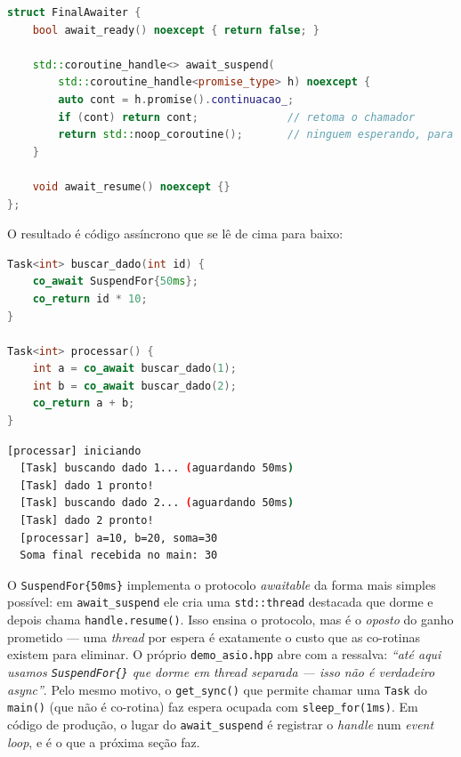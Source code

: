 \begin{lstlisting}[style=bt, language=C++,
    caption={O \texttt{FinalAwaiter} de \texttt{src/coroutines/demo\_task.hpp}:
             ``ao terminar, retome quem me esperava''.}]
struct FinalAwaiter {
    bool await_ready() noexcept { return false; }

    std::coroutine_handle<> await_suspend(
        std::coroutine_handle<promise_type> h) noexcept {
        auto cont = h.promise().continuacao_;
        if (cont) return cont;              // retoma o chamador
        return std::noop_coroutine();       // ninguem esperando, para
    }

    void await_resume() noexcept {}
};
\end{lstlisting}

O resultado é código assíncrono que se lê de cima para baixo:

\begin{lstlisting}[style=bt, language=C++,
    caption={\texttt{src/coroutines/demo\_task.hpp}: duas esperas encadeadas,
             sem \emph{callback} e sem \emph{thread} parada.}]
Task<int> buscar_dado(int id) {
    co_await SuspendFor{50ms};
    co_return id * 10;
}

Task<int> processar() {
    int a = co_await buscar_dado(1);
    int b = co_await buscar_dado(2);
    co_return a + b;
}
\end{lstlisting}

\begin{lstlisting}[style=bt, language=bash,
    caption={Saída de \texttt{dist/bin/coroutines}, demo 2.2.}]
  [processar] iniciando
  [Task] buscando dado 1... (aguardando 50ms)
  [Task] dado 1 pronto!
  [Task] buscando dado 2... (aguardando 50ms)
  [Task] dado 2 pronto!
  [processar] a=10, b=20, soma=30
  Soma final recebida no main: 30
\end{lstlisting}

\begin{armadilha}
O \texttt{SuspendFor\{50ms\}} implementa o protocolo \emph{awaitable} da forma
mais simples possível: em \texttt{await\_suspend} ele cria uma
\texttt{std::thread} destacada que dorme e depois chama
\texttt{handle.resume()}. Isso ensina o protocolo, mas é o \emph{oposto} do
ganho prometido --- uma \emph{thread} por espera é exatamente o custo que as
co-rotinas existem para eliminar. O próprio \texttt{demo\_asio.hpp} abre com a
ressalva: \emph{``até aqui usamos \texttt{SuspendFor\{\}} que dorme em thread
separada --- isso não é verdadeiro async''}. Pelo mesmo motivo, o
\texttt{get\_sync()} que permite chamar uma \texttt{Task} do \texttt{main()}
(que não é co-rotina) faz espera ocupada com \texttt{sleep\_for(1ms)}. Em
código de produção, o lugar do \texttt{await\_suspend} é registrar o
\emph{handle} num \emph{event loop}, e é o que a próxima seção faz.
\end{armadilha}

